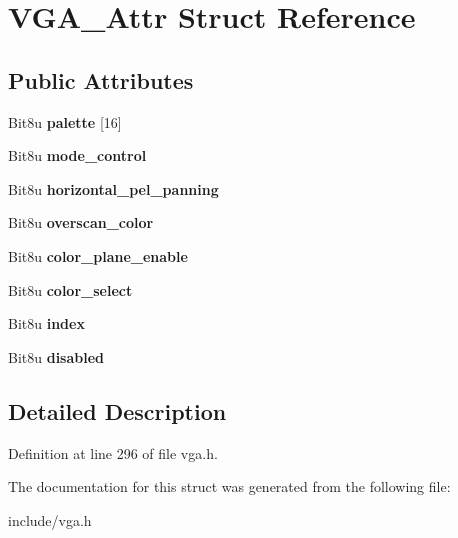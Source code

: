 \hypertarget{structVGA__Attr}{\section{V\-G\-A\-\_\-\-Attr Struct Reference}
\label{structVGA__Attr}
}
\subsection*{Public Attributes}
\begin{DoxyCompactItemize}
\item 
\hypertarget{structVGA__Attr_ad99b88df8836cef9a71a302eef58c6bc}{Bit8u {\bfseries palette} \mbox{[}16\mbox{]}}\label{structVGA__Attr_ad99b88df8836cef9a71a302eef58c6bc}

\item 
\hypertarget{structVGA__Attr_a1b1f9b873cb25af5b2258157ec294b67}{Bit8u {\bfseries mode\-\_\-control}}\label{structVGA__Attr_a1b1f9b873cb25af5b2258157ec294b67}

\item 
\hypertarget{structVGA__Attr_a57f5441e85ade86c8ac8a47db2eee8a6}{Bit8u {\bfseries horizontal\-\_\-pel\-\_\-panning}}\label{structVGA__Attr_a57f5441e85ade86c8ac8a47db2eee8a6}

\item 
\hypertarget{structVGA__Attr_a8728e17ec288d51e4b915af094916daa}{Bit8u {\bfseries overscan\-\_\-color}}\label{structVGA__Attr_a8728e17ec288d51e4b915af094916daa}

\item 
\hypertarget{structVGA__Attr_a87dc770222aa6ab0f30f1dd2288be390}{Bit8u {\bfseries color\-\_\-plane\-\_\-enable}}\label{structVGA__Attr_a87dc770222aa6ab0f30f1dd2288be390}

\item 
\hypertarget{structVGA__Attr_abf6a172f77c5af11b8fe91047af55b98}{Bit8u {\bfseries color\-\_\-select}}\label{structVGA__Attr_abf6a172f77c5af11b8fe91047af55b98}

\item 
\hypertarget{structVGA__Attr_a068d49ae844631d0e0863fbaa6c82df4}{Bit8u {\bfseries index}}\label{structVGA__Attr_a068d49ae844631d0e0863fbaa6c82df4}

\item 
\hypertarget{structVGA__Attr_a6c14506b028f7cdc1b0b57bd2bbf57e2}{Bit8u {\bfseries disabled}}\label{structVGA__Attr_a6c14506b028f7cdc1b0b57bd2bbf57e2}

\end{DoxyCompactItemize}


\subsection{Detailed Description}


Definition at line 296 of file vga.\-h.



The documentation for this struct was generated from the following file\-:\begin{DoxyCompactItemize}
\item 
include/vga.\-h\end{DoxyCompactItemize}
